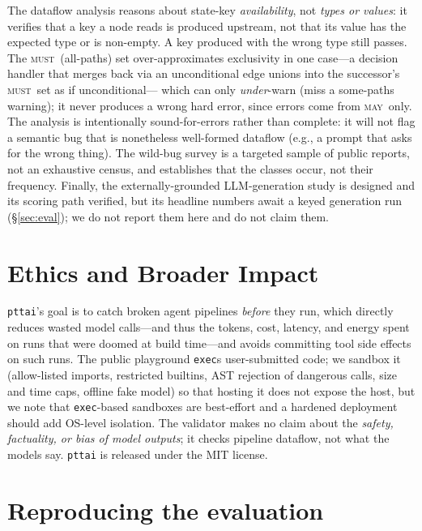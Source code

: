 \documentclass[11pt]{article}
\newcommand{\may}{\textsc{may}}
\newcommand{\must}{\textsc{must}}
\newcommand{\code}[1]{\texttt{#1}}
\begin{document}
The dataflow analysis reasons about state-key \emph{availability}, not
\emph{types or values}: it verifies that a key a node reads is produced upstream,
not that its value has the expected type or is non-empty. A key produced with the
wrong type still passes. The \must\ (all-paths) set over-approximates
exclusivity in one case---a decision handler that merges back via an
unconditional edge unions into the successor's \must\ set as if unconditional---
which can only \emph{under}-warn (miss a some-paths warning); it never produces a
wrong hard error, since errors come from \may\ only. The analysis is intentionally
sound-for-errors rather than complete: it will not flag a semantic bug that is
nonetheless well-formed dataflow (e.g., a prompt that asks for the wrong thing).
The wild-bug survey is a targeted sample of public reports, not an exhaustive
census, and establishes that the classes occur, not their frequency. Finally,
the externally-grounded LLM-generation study is designed and its scoring path
verified, but its headline numbers await a keyed generation run
(\S\ref{sec:eval}); we do not report them here and do not claim them.

\section*{Ethics and Broader Impact}

\code{pttai}'s goal is to catch broken agent pipelines \emph{before} they run,
which directly reduces wasted model calls---and thus the tokens, cost, latency,
and energy spent on runs that were doomed at build time---and avoids committing
tool side effects on such runs. The public playground \code{exec}s
user-submitted code; we sandbox it (allow-listed imports, restricted builtins,
AST rejection of dangerous calls, size and time caps, offline fake model) so that
hosting it does not expose the host, but we note that \code{exec}-based sandboxes
are best-effort and a hardened deployment should add OS-level isolation. The
validator makes no claim about the \emph{safety, factuality, or bias of model
outputs}; it checks pipeline dataflow, not what the models say. \code{pttai} is
released under the MIT license.



\appendix

\section{Reproducing the evaluation}
\label{app:repro}
\end{document}
